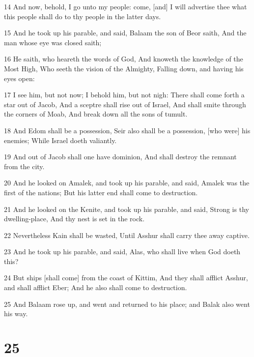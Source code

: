 \par 14 And now, behold, I go unto my people: come, [and] I will advertise thee what this people shall do to thy people in the latter days.
\par 15 And he took up his parable, and said, Balaam the son of Beor saith, And the man whose eye was closed saith;
\par 16 He saith, who heareth the words of God, And knoweth the knowledge of the Most High, Who seeth the vision of the Almighty, Falling down, and having his eyes open:
\par 17 I see him, but not now; I behold him, but not nigh: There shall come forth a star out of Jacob, And a sceptre shall rise out of Israel, And shall smite through the corners of Moab, And break down all the sons of tumult.
\par 18 And Edom shall be a possession, Seir also shall be a possession, [who were] his enemies; While Israel doeth valiantly.
\par 19 And out of Jacob shall one have dominion, And shall destroy the remnant from the city.
\par 20 And he looked on Amalek, and took up his parable, and said, Amalek was the first of the nations; But his latter end shall come to destruction.
\par 21 And he looked on the Kenite, and took up his parable, and said, Strong is thy dwelling-place, And thy nest is set in the rock.
\par 22 Nevertheless Kain shall be wasted, Until Asshur shall carry thee away captive.
\par 23 And he took up his parable, and said, Alas, who shall live when God doeth this?
\par 24 But ships [shall come] from the coast of Kittim, And they shall afflict Asshur, and shall afflict Eber; And he also shall come to destruction.
\par 25 And Balaam rose up, and went and returned to his place; and Balak also went his way.

\chapter{25}


